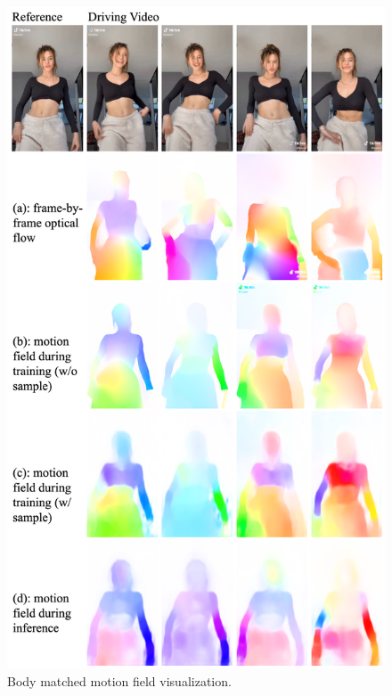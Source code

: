 \begin{figure}[t]
    \centering
    \includegraphics[width=.9\columnwidth]{./image/flow1.png}
    \vspace{-10pt}
    \caption{Body matched motion field visualization.}
    \label{fig: appendix_flow1}
\end{figure}

